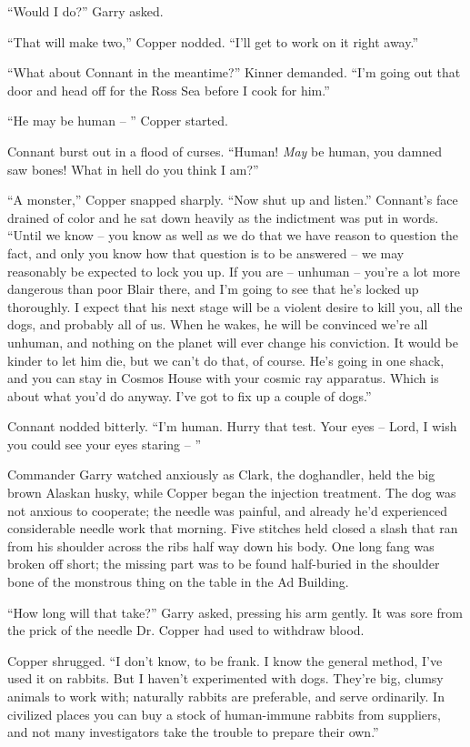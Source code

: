\documentclass[letterpaper,openany,12pt]{memoir}		%
\begin{document}
``Would I do?'' Garry asked.

``That will make two,'' Copper nodded. ``I'll get to work on it right away.''

``What about Connant in the meantime?'' Kinner demanded. ``I'm going out that
door and head off for the Ross Sea before I cook for him.''

``He may be human -- '' Copper started.

Connant burst out in a flood of curses. ``Human! \emph{May} be human, you damned
saw bones! What in hell do you think I am?''

``A monster,'' Copper snapped sharply. ``Now shut up and listen.'' Connant's
face drained of color and he sat down heavily as the indictment was put in
words. ``Until we know -- you know as well as we do that we have reason to
question the fact, and only you know how that question is to be answered -- we
may reasonably be expected to lock you up. If you are -- unhuman -- you're a lot
more dangerous than poor Blair there, and I'm going to see that he's locked up
thoroughly. I expect that his next stage will be a violent desire to kill you,
all the dogs, and probably all of us. When he wakes, he will be convinced we're
all unhuman, and nothing on the planet will ever change his conviction. It would
be kinder to let him die, but we can't do that, of course. He's going in one
shack, and you can stay in Cosmos House with your cosmic ray apparatus. Which is
about what you'd do anyway. I've got to fix up a couple of dogs.''

Connant nodded bitterly. ``I'm human. Hurry that test. Your eyes -- Lord, I wish
you could see your eyes staring -- ''

Commander Garry watched anxiously as Clark, the doghandler, held the big brown
Alaskan husky, while Copper began the injection treatment. The dog was not
anxious to cooperate; the needle was painful, and already he'd experienced
considerable needle work that morning. Five stitches held closed a slash that
ran from his shoulder across the ribs half way down his body. One long fang was
broken off short; the missing part was to be found half-buried in the shoulder
bone of the monstrous thing on the table in the Ad Building.

``How long will that take?'' Garry asked, pressing his arm gently. It was sore
from the prick of the needle Dr. Copper had used to withdraw blood.

Copper shrugged. ``I don't know, to be frank. I know the general method, I've
used it on rabbits. But I haven't experimented with dogs. They're big, clumsy
animals to work with; naturally rabbits are preferable, and serve ordinarily. In
civilized places you can buy a stock of human-immune rabbits from suppliers, and
not many investigators take the trouble to prepare their own.''
\end{document}
